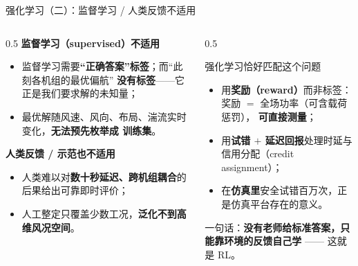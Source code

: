 \documentclass[aspectratio=169,10pt,UTF8]{ctexbeamer}
\newcommand{\hl}[1]{{\color{myblue}\bfseries #1}}
\newcommand{\hlr}[1]{{\color{myred}\bfseries #1}}
\begin{document}
\begin{frame}{强化学习（二）：监督学习 / 人类反馈不适用}
  \begin{columns}[T]
    \begin{column}{0.5\textwidth}
      \textbf{监督学习（supervised）不适用}
      \begin{itemize}\small
        \item 监督学习需要\hlr{“正确答案”标签}；而“此刻各机组的最优偏航”
              \textbf{没有标签}——它正是我们要求解的未知量；
        \item 最优解随风速、风向、布局、湍流实时变化，\textbf{无法预先枚举成
              训练集}。
      \end{itemize}
      \vspace{0.2em}
      \textbf{人类反馈 / 示范也不适用}
      \begin{itemize}\small
        \item 人类难以对\textbf{数十秒延迟、跨机组耦合}的后果给出可靠即时评价；
        \item 人工整定只覆盖少数工况，\hlr{泛化不到高维风况空间}。
      \end{itemize}
    \end{column}
    \begin{column}{0.5\textwidth}
      \begin{block}{强化学习恰好匹配这个问题}
        \small
        \begin{itemize}\small
          \item 用\hl{奖励（reward）}而非标签：奖励 $=$ 全场功率（可含载荷惩罚），
                \textbf{可直接测量}；
          \item 用\hl{试错 $+$ 延迟回报}处理时延与信用分配（credit assignment）；
          \item 在\textbf{仿真里}安全试错百万次，正是仿真平台存在的意义。
        \end{itemize}
      \end{block}
      \begin{center}\scriptsize
        一句话：\hl{没有老师给标准答案，只能靠环境的反馈自己学} —— 这就是 RL。
      \end{center}
    \end{column}
  \end{columns}
\end{frame}
\end{document}
